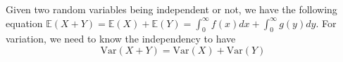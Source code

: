 \documentclass[preview,border=10pt]{standalone}
\newcommand{\bbE}{\mathbb{E}}
\newcommand{\Var}{\mathrm{Var}}
\begin{document}
    Given two random variables being independent or not, we have the following equation $\bbE(X+Y)=\bbE(X)+\bbE(Y)=\int_0^\infty f(x)dx+\int_0^\infty g(y)dy$. For variation, we need to know the independency to have
    \begin{displaymath}
       \Var(X+Y)=\Var(X)+\Var(Y)
    \end{displaymath}
\end{document}
